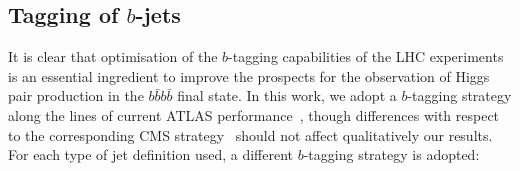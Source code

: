 \subsection{Tagging of $b$-jets}
\label{sec:btagging}

It is clear that
optimisation of the $b$-tagging capabilities of the
LHC experiments is an essential ingredient to improve
the prospects for the observation of Higgs pair production in the
$b\bar{b}b\bar{b}$ final state.
%
In this work, we adopt
a $b$-tagging strategy along the lines
of current ATLAS performance~\cite{Aad:2013gja,Aad:2015ydr},
though differences with respect to
the corresponding CMS strategy~\cite{Khachatryan:2011wq,Chatrchyan:2012jua}
should not affect qualitatively our results.
%
For each type of jet definition used, a different
$b$-tagging strategy is adopted:

